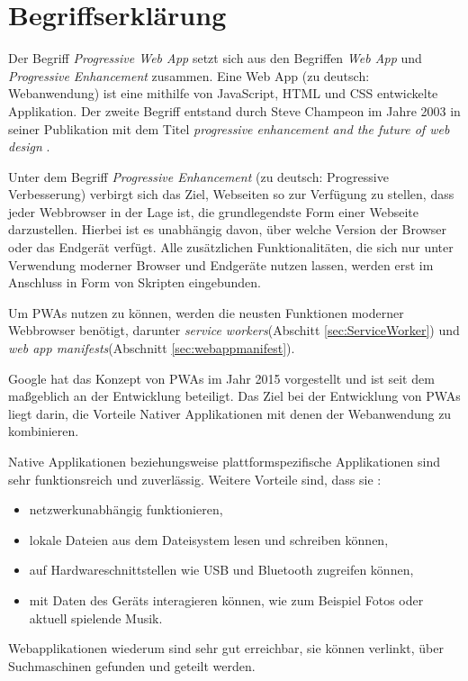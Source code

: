 \section{Begriffserklärung}\label{se:Begriffserklaerung}

Der Begriff \textit{Progressive Web App} setzt sich aus den Begriffen \textit{Web App} und \textit{Progressive Enhancement} zusammen. Eine Web App (zu deutsch: Webanwendung) ist eine mithilfe von JavaScript, HTML und CSS entwickelte Applikation. Der zweite Begriff entstand durch Steve Champeon im Jahre 2003 in seiner Publikation mit dem Titel \textit{progressive enhancement and the future of web design} \cite{Champeon}.

Unter dem Begriff \textit{Progressive Enhancement} (zu deutsch: Progressive Verbesserung) verbirgt sich das Ziel, Webseiten so zur Verfügung zu stellen, dass jeder Webbrowser in der Lage ist, die grundlegendste Form einer Webseite darzustellen. Hierbei ist es unabhängig davon, über welche Version der Browser oder das Endgerät verfügt. 
Alle zusätzlichen Funktionalitäten, die sich nur unter Verwendung moderner Browser und Endgeräte nutzen lassen, werden erst im Anschluss in Form von Skripten eingebunden. 

Um PWAs nutzen zu können, werden die neusten Funktionen moderner Webbrowser benötigt, darunter \textit{service workers}(Abschitt \ref{sec:ServiceWorker}) und \textit{web app manifests}(Abschnitt \ref{sec:webappmanifest}). 

Google hat das Konzept von PWAs im Jahr 2015 vorgestellt und ist seit dem maßgeblich an der Entwicklung beteiligt. 
Das Ziel bei der Entwicklung von PWAs liegt darin, die Vorteile Nativer Applikationen mit denen der Webanwendung zu kombinieren. 


Native Applikationen beziehungsweise plattformspezifische Applikationen sind sehr funktionsreich und zuverlässig. Weitere Vorteile sind, dass sie : 
\begin{itemize}
    \item  netzwerkunabhängig funktionieren,
    \item  lokale Dateien aus dem Dateisystem lesen und schreiben können, 
    \item  auf Hardwareschnittstellen wie USB und Bluetooth zugreifen können, 
    \item  mit Daten des Geräts interagieren können, wie zum Beispiel Fotos oder aktuell spielende Musik. 
\end{itemize}

Webapplikationen wiederum sind sehr gut erreichbar, sie können verlinkt, über Suchmaschinen gefunden und geteilt werden. 


